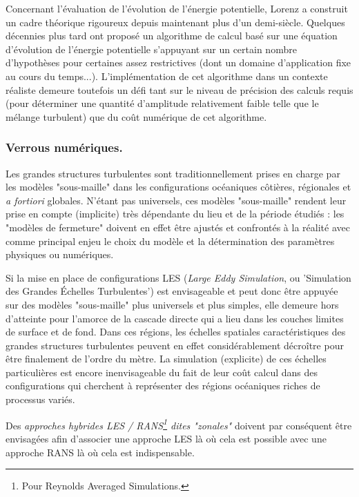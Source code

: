 Concernant l'évaluation de l'évolution de l'énergie potentielle, Lorenz \citep{lorenz_available_1955} a construit un cadre théorique rigoureux depuis maintenant plus d'un demi-siècle. Quelques décennies plus tard \cite{winters_available_1995} ont proposé un algorithme de calcul basé sur une équation d'évolution de l'énergie potentielle s'appuyant sur un certain nombre d'hypothèses pour certaines assez restrictives (dont un domaine d'application fixe au cours du temps...). L'implémentation de cet algorithme dans un contexte réaliste demeure toutefois un défi tant sur le niveau de précision des calculs requis (pour déterminer une quantité d'amplitude relativement faible telle que le mélange turbulent) que du coût numérique de cet algorithme.


\subsubsection{Verrous numériques.}
Les grandes structures turbulentes sont traditionnellement prises en charge par les modèles "sous-maille" dans les configurations océaniques côtières, régionales et \textit{a fortiori} globales. N'étant pas universels, ces modèles "sous-maille" rendent leur prise en compte (implicite) très dépendante du lieu et de la période étudiés : les "modèles de fermeture" doivent en effet être ajustés et confrontés à la réalité avec comme principal enjeu le choix du modèle et la détermination des paramètres physiques ou numériques.

Si la mise en place de configurations LES (\textit{Large Eddy Simulation}, ou 'Simulation des Grandes Échelles Turbulentes') est envisageable et peut donc être appuyée sur des modèles "sous-maille" plus universels et plus simples, elle demeure hors d’atteinte pour l'amorce de la cascade directe qui a lieu dans les couches limites de surface et de fond. Dans ces régions, les échelles spatiales caractéristiques des grandes structures turbulentes peuvent en effet considérablement décroître pour être finalement de l'ordre du mètre. La simulation (explicite) de ces échelles particulières est encore inenvisageable du fait de leur coût calcul dans des configurations qui cherchent à représenter des régions océaniques riches de processus variés. 

Des \textit{approches hybrides LES / RANS\footnote{Pour Reynolds Averaged Simulations.} dites "zonales"} \citep{friess_modelisation_2010} doivent par conséquent être envisagées afin d'associer une approche LES là où cela est possible avec une approche RANS là où cela est indispensable.

